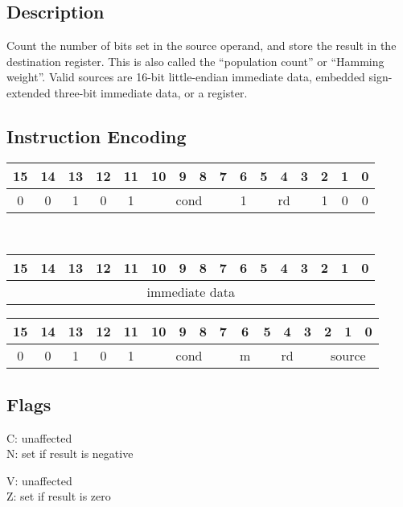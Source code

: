 \documentclass[11pt]{book}
\newcommand*{\encoding}[1]{\noindent
\begin{tabular}{|c|c|c|c|c|c|c|c|c|c|c|c|c|c|c|c|}
\multicolumn{1}{c}{15}&
\multicolumn{1}{c}{14}&
\multicolumn{1}{c}{13}&
\multicolumn{1}{c}{12}&
\multicolumn{1}{c}{11}&
\multicolumn{1}{c}{10}&
\multicolumn{1}{c}{9}&
\multicolumn{1}{c}{8}&
\multicolumn{1}{c}{7}&
\multicolumn{1}{c}{6}&
\multicolumn{1}{c}{5}&
\multicolumn{1}{c}{4}&
\multicolumn{1}{c}{3}&
\multicolumn{1}{c}{2}&
\multicolumn{1}{c}{1}&
\multicolumn{1}{c}{0}\\\hline
#1\\\hline
\end{tabular}}
\begin{document}
\subsection*{Description}
Count the number of bits set in the source operand,
and store the result in the destination register.
This is also called the ``population count'' or ``Hamming weight''.
Valid sources are 16-bit little-endian immediate data,
embedded sign-extended three-bit immediate data,
or a register.

\subsection*{Instruction Encoding}
\encoding{0&0&1&0&1%
&\multicolumn{4}{|c|}{cond}%
&1&\multicolumn{3}{|c|}{rd}&1&0&0}\\\null\qquad
\encoding{\multicolumn{16}{|c|}{immediate data}}

\vspace{2\baselineskip}
\encoding{0&0&1&0&1%
&\multicolumn{4}{|c|}{cond}%
&m&\multicolumn{3}{|c|}{rd}&\multicolumn{3}{|c|}{source}}

\subsection*{Flags}
\begin{multicols}{2}\noindent
  C: unaffected\\
  N: set if result is negative

  \columnbreak\noindent
  V: unaffected\\
  Z: set if result is zero
\end{multicols}
\end{document}
